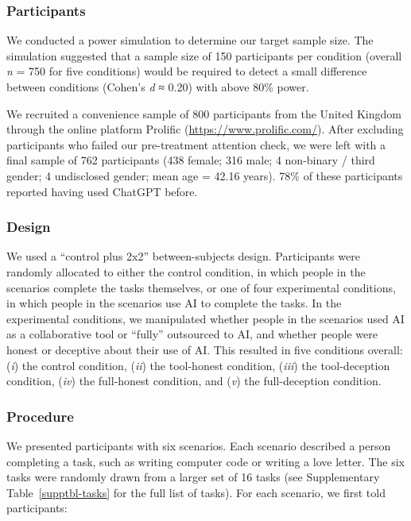 \documentclass[
  man,
  floatsintext,
  longtable,
  nolmodern,
  notxfonts,
  notimes,
  colorlinks=true,linkcolor=blue,citecolor=blue,urlcolor=blue]{apa7}
\begin{document}
\subsubsection*{Participants}\label{participants}

We conducted a power simulation to determine our target sample size. The
simulation suggested that a sample size of 150 participants per
condition (overall \emph{n} = 750 for five conditions) would be required
to detect a small difference between conditions (Cohen's \emph{d} ≈
0.20) with above 80\% power.

We recruited a convenience sample of 800 participants from the United
Kingdom through the online platform Prolific
(\url{https://www.prolific.com/}). After excluding participants who
failed our pre-treatment attention check, we were left with a final
sample of 762 participants (438 female; 316 male; 4 non-binary / third
gender; 4 undisclosed gender; mean age = 42.16 years). 78\% of these
participants reported having used ChatGPT before.

\subsubsection*{Design}\label{design}

We used a ``control plus 2x2'' between-subjects design. Participants
were randomly allocated to either the control condition, in which people
in the scenarios complete the tasks themselves, or one of four
experimental conditions, in which people in the scenarios use AI to
complete the tasks. In the experimental conditions, we manipulated
whether people in the scenarios used AI as a collaborative tool or
``fully'' outsourced to AI, and whether people were honest or deceptive
about their use of AI. This resulted in five conditions overall:
(\emph{i}) the control condition, (\emph{ii}) the tool-honest condition,
(\emph{iii}) the tool-deception condition, (\emph{iv}) the full-honest
condition, and (\emph{v}) the full-deception condition.

\subsubsection*{Procedure}\label{procedure}

We presented participants with six scenarios. Each scenario described a
person completing a task, such as writing computer code or writing a
love letter. The six tasks were randomly drawn from a larger set of 16
tasks (see Supplementary Table~\ref{supptbl-tasks} for the full list of
tasks). For each scenario, we first told participants:
\end{document}
